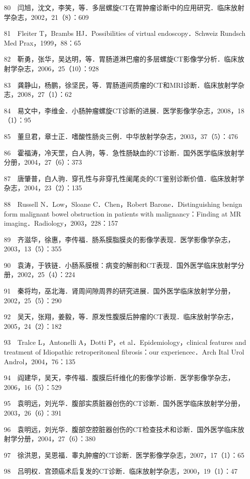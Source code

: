 80　闫旭，沈文，李笑，等．多层螺旋CT在胃肿瘤诊断中的应用研究．临床放射学杂志，2002，21（8）：609

81　Fleiter T，Brambs HJ．Possibilities of virtual endoscopy．Schweiz
Rundsch Med Prax，1999，88：65

82　靳勇，张华，吴达明，等．胃肠道淋巴瘤的多层螺旋CT影像学分析．临床放射学杂志，2006，25（10）：928

83　龚静山，杨鹏，徐坚民，等．胃肠道间质瘤的CT和MRI诊断．临床放射学杂志，2008，27（1）：62

84　易文中，李维金．小肠肿瘤螺旋CT诊断的进展．医学影像学杂志，2008，18（1）：95

85　董旦君，章士正．嗜酸性肠炎三例．中华放射学杂志，2003，37（5）：476

86　霍福涛，冷天罡，白人驹，等．急性肠缺血的CT诊断．国外医学临床放射学分册，2004，27（6）：373

87　唐肇普，白人驹．穿孔性与非穿孔性阑尾炎的CT鉴别诊断价值．临床放射学杂志，2004，23（2）：135

88　Russell N．Low，Sloane C．Chen，Robert Barone．Distinguishing benign
form malignant bowel obstruction in patients with malignancy：Finding at
MR imaging．Radiology，2003，228：157

89　齐滋华，徐惠，李传福．肠系膜脂膜炎的影像学表现．医学影像学杂志，2003，13（5）：355

90　袁涛，于铁链．小肠系膜根：病变的解剖和CT表现．国外医学临床放射学分册，2002，25（4）：224

91　秦将均，巫北海．肾周间隙周界的研究进展．国外医学临床放射学分册，2002，25（5）：290

92　吴天，张翔，姜毅，等．原发性腹膜后肿瘤的CT表现．临床放射学杂志，2005，24（2）：182

93　Tralce L，Antonelli A，Dotti P，et al．Epidemiology，clinical
features and treatment of Idiopathic retroperitoneal fibrosis：our
experiencec．Arch Ital Urol Androl，2004，76：135

94　阎建华，吴天，李传福．腹膜后纤维化的影像学诊断．医学影像学杂志，2006，16（5）：529

95　袁明远，刘光华．腹部实质脏器创伤的CT诊断．国外医学临床放射学分册，2003，26（6）：391

96　袁明远，刘光华．腹部空腔脏器创伤的CT检查技术和诊断．国外医学临床放射学分册，2004，27（6）：380

97　徐洪恩，吴恩福．睾丸肿瘤的CT诊断．医学影像学杂志，2007，17（1）：65

98　吕明权．宫颈癌术后复发的CT诊断．临床放射学杂志，2000，19（1）：47

